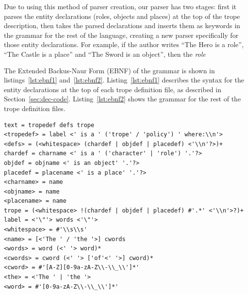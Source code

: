 \documentclass[11pt]{report}
\begin{document}
Due to using this method of parser creation, our parser has two stages: first it
parses the entity declarations (roles, objects and places) at the top of the
trope description, then takes the parsed declarations and inserts them as
keywords in the grammar for the rest of the language, creating a new parser
specifically for those entity declarations. For example, if the author writes
``The Hero is a role'', ``The Castle is a place'' and ``The Sword is an
object'', then the \emph{role} 


The Extended Backus-Naur Form (EBNF) of the grammar is shown in
listings~\ref{lst:ebnf1} and~\ref{lst:ebnf2}. Listing~\ref{lst:ebnf1} describes
the syntax for the entity declarations at the top of each trope definition file,
as described in Section~\ref{sec:dec-code}. Listing~\ref{lst:ebnf2} shows the
grammar for the rest of the trope definition files.

\begin{lstlisting}[showstringspaces=false,label={lst:ebnf1},caption={EBNF
grammar for the entity declarations in TropICAL}]
text = tropedef defs trope
<tropedef> = label <' is a ' ('trope' / 'policy') ' where:\\n'>
<defs> = (<whitespace> (chardef | objdef | placedef) <'\\n'?>)+
chardef = charname <' is a ' ('character' | 'role') '.'?>
objdef = objname <' is an object' '.'?>
placedef = placename <' is a place' '.'?>
<charname> = name
<objname> = name
<placename> = name
trope = (<whitespace> !(chardef | objdef | placedef) #'.*' <'\\n'>?)+
label = <'\"'> words <'\"'>
<whitespace> = #'\\s\\s'
<name> = [<'The ' / 'the '>] cwords
<words> = word (<' '> word)*
<cwords> = cword (<' '> ['of'<' '>] cword)*
<cword> = #'[A-Z][0-9a-zA-Z\\-\\_\\']*'
<the> = <'The ' | 'the '>
<word> = #'[0-9a-zA-Z\\-\\_\\']*'
\end{lstlisting}
\end{document}
